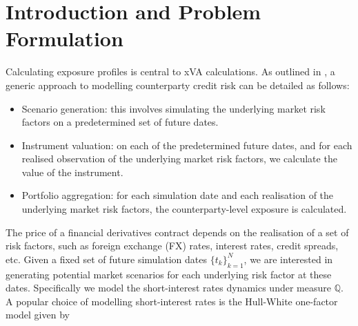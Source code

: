 \section{Introduction and Problem Formulation}
     Calculating exposure profiles is central to xVA calculations. As outlined in \cite{zhu2007guide}, a generic approach to modelling counterparty credit risk can be detailed as follows:
    
    \begin{itemize}
        \item Scenario generation: this involves simulating the underlying market risk factors on a predetermined set of future dates.
        \item Instrument valuation: on each of the predetermined future dates, and for each realised observation of the underlying market risk factors, we calculate the value of the instrument.
        \item Portfolio aggregation: for each simulation date and each realisation of the underlying market risk factors, the counterparty-level exposure is calculated.
    \end{itemize}

    \noindent
    The price of a financial derivatives contract depends on the realisation of a set of risk factors, such as foreign exchange (FX) rates, interest rates, credit spreads, etc. Given a fixed set of future simulation dates $\{t_k\}_{k=1}^{N}$, we are interested in generating potential market scenarios for each underlying risk factor at these dates. Specifically we model the short-interest rates dynamics under measure $\mathbb{Q}$. A popular choice of modelling short-interest rates is the Hull-White one-factor model given by 
 
